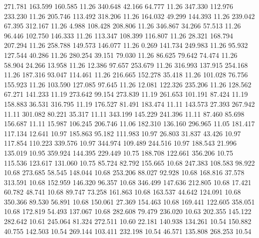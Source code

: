 271.781  163.599  160.585        11.26
 340.648   42.166   64.777        11.26
 347.330  112.976  233.230        11.26
 205.746  113.492  318.206        11.26
 164.032   49.299  144.393        11.26
 239.042   67.395  312.167        11.26
   4.988  108.428  208.806        11.26
 346.867   34.266   57.513        11.26
  96.446  102.750  146.333        11.26
 113.347  108.399  116.807        11.26
  28.321  168.794  207.294        11.26
 258.788  149.573  146.077        11.26
   0.269  141.734  249.983        11.26
  95.932  127.544   40.286        11.26
 280.254   39.151   79.030        11.26
  86.625   79.642   74.474        11.26
  58.904   24.266   13.958        11.26
  12.386   97.657  253.679        11.26
 316.993  137.915  254.168        11.26
 187.316   93.047  114.461        11.26
 216.665  152.278   35.418        11.26
 101.028   76.756  155.923        11.26
 103.590  127.085   97.645        11.26
  12.081  122.326  235.206        11.26
 128.562   67.271  141.233        11.19
 273.642   99.154  273.839        11.19
 261.653  101.191   87.424        11.19
 158.883   36.531  316.795        11.19
 176.527   81.491  183.474        11.11
 143.573   27.393  267.942        11.11
 301.082   80.221   35.317        11.11
 343.199  145.229  241.396        11.11
  87.460   85.698  156.687        11.11
  15.987  106.245  206.746        11.06
 182.310  136.160  296.965        11.05
 181.417  117.134   12.641        10.97
 185.863   95.182  111.983        10.97
  26.803   31.837   43.426        10.97
 117.854  110.223  339.576        10.97
 344.974  109.489  244.516        10.97
 188.543   21.996  135.019        10.95
 359.924  144.395  229.449        10.75
 188.708  122.661  356.206        10.75
 115.536  123.617  131.060        10.75
  85.724   82.792  155.665        10.68
 247.383  108.583   98.922        10.68
 273.685   58.545  148.044        10.68
 253.206   88.027   92.928        10.68
 168.816   37.578  313.591        10.68
 152.959  146.320   96.357        10.68
 346.499  147.636  212.805        10.68
  17.421   60.782   48.741        10.68
  89.747   73.258  161.863        10.68
 163.537   44.642  124.091        10.68
 350.366   89.530   56.891        10.68
 150.061   27.369  154.463        10.68
 169.441  122.605  358.051        10.68
 172.819   54.493  137.067        10.68
 282.608   79.479  236.020        10.63
 202.355  145.122  282.642        10.61
 245.064   81.324  272.511        10.60
  22.181  140.938  134.261        10.54
 150.882   40.755  142.503        10.54
 269.144  103.411  232.198        10.54
  46.571  135.808  268.253        10.54
